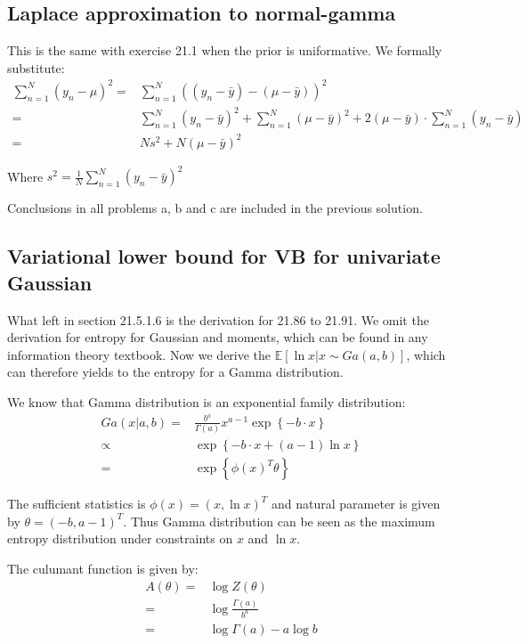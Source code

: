 \documentclass[UTF8]{ctexart}
\begin{document}
\subsection{Laplace approximation to normal-gamma}
This is the same with exercise 21.1 when the prior is uniformative. We formally substitute:
\begin{align}
\sum_{n=1}^{N}(y_{n}-\mu)^{2}=& \sum_{n=1}^{N}((y_{n}-\bar{y})-(\mu-\bar{y}))^{2} \nonumber \\
=&\sum_{n=1}^{N}(y_{n}-\bar{y})^{2} + \sum_{n=1}^{N}(\mu-\bar{y})^{2} + 2(\mu-\bar{y})\cdot\sum_{n=1}^{N}(y_{n}-\bar{y})\nonumber \\
=&Ns^{2}+N(\mu-\bar{y})^{2} \nonumber
\end{align}

Where $s^{2}=\frac{1}{N}\sum_{n=1}^{N}(y_{n}-\bar{y})^{2}$

Conclusions in all problems a, b and c are included in the previous solution.

\subsection{Variational lower bound for VB for univariate Gaussian}
What left in section 21.5.1.6 is the derivation for 21.86 to 21.91. We omit the derivation for entropy for Gaussian and moments, which can be found in any information theory textbook. Now we derive the $\mathbb{E}[\ln x|x \sim Ga(a,b)]$, which can therefore yields to the entropy for a Gamma distribution.

We know that Gamma distribution is an exponential family distribution:
\begin{align}
Ga(x|a,b)=&\frac{b^{a}}{\Gamma(a)}x^{a-1}\exp\left\{-b\cdot x \right\}\nonumber \\
\propto& \exp\left\{-b\cdot x+(a-1) \ln x  \right\} \nonumber\\
=&\exp\left\{ \phi(x)^{T}\theta \right\}\nonumber
\end{align}

The sufficient statistics is $\phi(x)=(x,\ln x)^{T}$ and natural parameter is given by $\theta = (-b,a-1)^{T}$. Thus Gamma distribution can be seen as the maximum entropy distribution under constraints on $x$ and $\ln x$. 

The culumant function is given by:
\begin{align}
A(\theta)=& \log Z(\theta)\nonumber \\
=&\log \frac{\Gamma(a)}{b^{a}} \nonumber \\
=&\log \Gamma(a) - a \log b \nonumber
\end{align}
\end{document}
